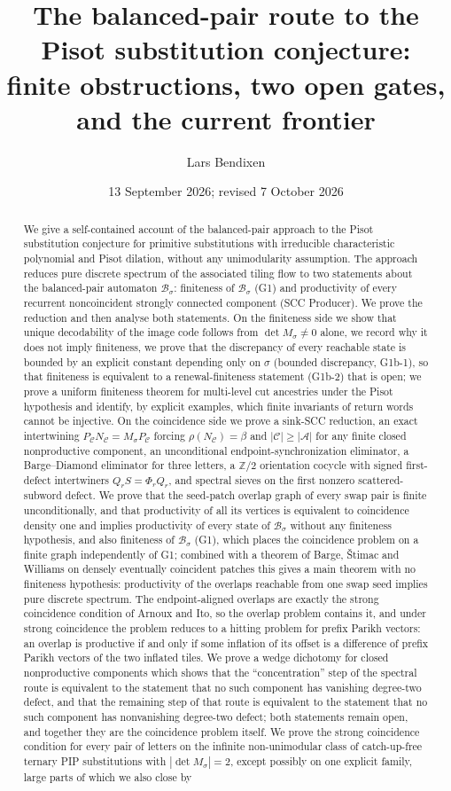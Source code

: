 \documentclass[11pt]{amsart}
\title[Balanced pairs and the Pisot substitution conjecture]{The balanced-pair route to the Pisot substitution conjecture:\\ finite obstructions, two open gates, and the current frontier}
\author{Lars Bendixen}
\date{13 September 2026; revised 7 October 2026}
\theoremstyle{plain}
\theoremstyle{definition}
\theoremstyle{remark}
\newcommand{\Z}{\mathbb{Z}}
\newcommand{\A}{\mathcal{A}}
\newcommand{\B}{\mathcal{B}}
\newcommand{\cC}{\mathcal{C}}
\newcommand{\PDS}{pure discrete spectrum}
\begin{document}
\begin{abstract}
We give a self-contained account of the balanced-pair approach to the Pisot substitution conjecture for primitive substitutions with irreducible characteristic polynomial and Pisot dilation, without any unimodularity assumption. The approach reduces \PDS{} of the associated tiling flow to two statements about the balanced-pair automaton $\B_\sigma$: finiteness of $\B_\sigma$ (G1) and productivity of every recurrent noncoincident strongly connected component (SCC Producer). We prove the reduction and then analyse both statements. On the finiteness side we show that unique decodability of the image code follows from $\det M_\sigma\neq 0$ alone, we record why it does not imply finiteness, we prove that the discrepancy of every reachable state is bounded by an explicit constant depending only on $\sigma$ (bounded discrepancy, G1b-1), so that finiteness is equivalent to a renewal-finiteness statement (G1b-2) that is open; we prove a uniform finiteness theorem for multi-level cut ancestries under the Pisot hypothesis and identify, by explicit examples, which finite invariants of return words cannot be injective. On the coincidence side we prove a sink-SCC reduction, an exact intertwining $P_\cC N_\cC=M_\sigma P_\cC$ forcing $\rho(N_\cC)=\beta$ and $|\cC|\ge|\A|$ for any finite closed nonproductive component, an unconditional endpoint-synchronization eliminator, a Barge--Diamond eliminator for three letters, a $\Z/2$ orientation cocycle with signed first-defect intertwiners $Q_rS=\Phi_rQ_r$, and spectral sieves on the first nonzero scattered-subword defect. We prove that the seed-patch overlap graph of every swap pair is finite unconditionally, and that productivity of all its vertices is equivalent to coincidence density one and implies productivity of every state of $\B_\sigma$ without any finiteness hypothesis, and also finiteness of $\B_\sigma$ (G1), which places the coincidence problem on a finite graph independently of G1; combined with a theorem of Barge, \v{S}timac and Williams on densely eventually coincident patches this gives a main theorem with no finiteness hypothesis: productivity of the overlaps reachable from one swap seed implies pure discrete spectrum. The endpoint-aligned overlaps are exactly the strong coincidence condition of Arnoux and Ito, so the overlap problem contains it, and under strong coincidence the problem reduces to a hitting problem for prefix Parikh vectors: an overlap is productive if and only if some inflation of its offset is a difference of prefix Parikh vectors of the two inflated tiles. We prove a wedge dichotomy for closed nonproductive components which shows that the ``concentration'' step of the spectral route is equivalent to the statement that no such component has vanishing degree-two defect, and that the remaining step of that route is equivalent to the statement that no such component has nonvanishing degree-two defect; both statements remain open, and together they are the coincidence problem itself. We prove the strong coincidence condition for every pair of letters on the infinite non-unimodular class of catch-up-free ternary PIP substitutions with $|\det M_\sigma|=2$, except possibly on one explicit family, large parts of which we also close by 
\end{abstract}
\end{document}
